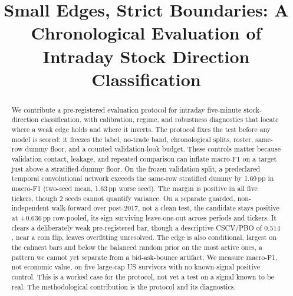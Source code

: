 \documentclass[sigconf,review,anonymous]{acmart}
\newcommand{\macrofone}{macro-F1}          %
\newcommand{\pp}{\,\textrm{pp}}             %
\newcommand{\numseeds}{2}                   %
\begin{document}
\raggedbottom

\title{Small Edges, Strict Boundaries: A Chronological Evaluation of Intraday Stock Direction Classification}


\begin{abstract}
We contribute a pre-registered evaluation protocol for intraday five-minute
stock-direction classification, with calibration, regime, and robustness
diagnostics that locate where a weak edge holds and where it inverts. The protocol
fixes the test before any model is scored: it freezes the label, no-trade band,
chronological splits, roster, same-row dummy floor, and a counted validation-look
budget. These controls matter because validation contact, leakage, and repeated
comparison can inflate \macrofone{} on a target just above a stratified-dummy floor.
On the frozen validation split, a predeclared temporal convolutional network exceeds
the same-row stratified dummy by 1.69\pp{} in \macrofone{} (two-seed mean,
1.63\pp{} worse seed). The margin is positive in all five tickers, though
\numseeds{} seeds cannot quantify variance. On a separate guarded, non-independent
walk-forward over post-2017, not a clean test, the candidate stays positive at
$+0.636\pp{}$ row-pooled, its sign surviving leave-one-out across periods and
tickers. It clears a deliberately weak pre-registered bar, though a descriptive
CSCV/PBO of $0.514$, near a coin flip, leaves overfitting unresolved. The edge is
also conditional, largest on the calmest bars and below the balanced random prior on
the most active ones, a pattern we cannot yet separate from a bid-ask-bounce
artifact. We measure \macrofone{}, not economic value, on five large-cap US
survivors with no known-signal positive control. This is a worked case for the
protocol, not yet a test on a signal known to be real. The methodological contribution
is the protocol and its diagnostics.
\end{abstract}
\end{document}

